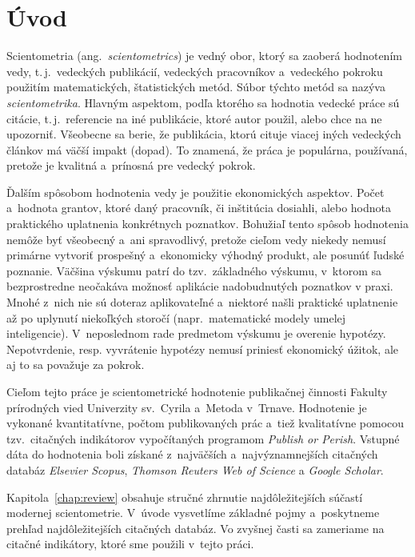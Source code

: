 \chapter*{Úvod}

Scientometria (ang.~\emph{scientometrics}) je vedný obor, ktorý sa zaoberá
hodnotením vedy, t.\,j.~vedeckých publikácií, vedeckých pracovníkov a~vedeckého
pokroku použitím matematických, štatistických metód.  Súbor týchto metód sa
nazýva \emph{scientometrika}.  Hlavným aspektom, podľa ktorého sa hodnotia
vedecké práce sú citácie, t.\,j.~referencie na iné publikácie, ktoré autor
použil, alebo chce na ne upozorniť.  Všeobecne sa berie, že publikácia, ktorú
cituje viacej iných vedeckých článkov má väčší impakt (dopad).  To znamená, že
práca je populárna, používaná, pretože je kvalitná a~prínosná pre vedecký
pokrok.

Ďalším spôsobom hodnotenia vedy je použitie ekonomických aspektov.  Počet
a~hodnota grantov, ktoré daný pracovník, či inštitúcia dosiahli, alebo hodnota
praktického uplatnenia konkrétnych poznatkov.  Bohužiaľ tento spôsob hodnotenia
nemôže byť všeobecný a~ani spravodlivý, pretože cieľom vedy niekedy nemusí
primárne vytvoriť prospešný a~ekonomicky výhodný produkt, ale posunúť ľudské
poznanie.  Väčšina výskumu patrí do tzv.~základného výskumu, v~ktorom sa
bezprostredne neočakáva možnosť aplikácie nadobudnutých poznatkov v praxi.
Mnohé z~nich nie sú doteraz aplikovateľné a~niektoré našli praktické uplatnenie
až po uplynutí niekoľkých storočí (napr.~matematické modely umelej
inteligencie).  V~neposlednom rade predmetom výskumu je overenie hypotézy.
Nepotvrdenie, resp. vyvrátenie hypotézy nemusí priniesť ekonomický úžitok,
ale aj to sa považuje za pokrok.

Cieľom tejto práce je scientometrické hodnotenie publikačnej činnosti Fakulty
prírodných vied Univerzity sv.~Cyrila a~Metoda v~Trnave.  Hodnotenie je
vykonané kvantitatívne, počtom publikovaných prác a~tiež kvalitatívne pomocou
tzv.~citačných indikátorov vypočítaných programom \emph{Publish or Perish}.
Vstupné dáta do hodnotenia boli získané z~najväčších a~najvýznamnejších
citačných databáz \emph{Elsevier Scopus}, \emph{Thomson Reuters Web of Science}
a \emph{Google Scholar}.

Kapitola~\ref{chap:review} obsahuje stručné zhrnutie najdôležitejších súčastí
modernej scientometrie.  V~úvode vysvetlíme základné pojmy a~poskytneme prehľad
najdôležitejších citačných databáz.  Vo zvyšnej časti sa zameriame na citačné
indikátory, ktoré sme použili v~tejto práci.

